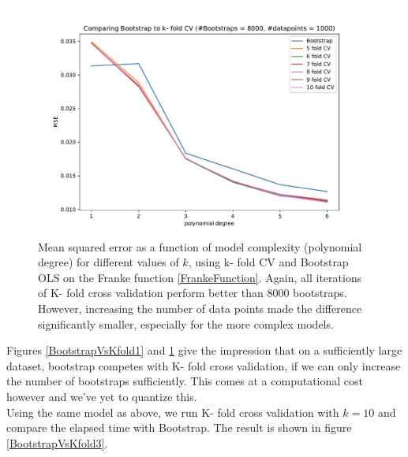 \documentclass[11pt,a4paper,titlepage]{article}
\begin{document}
\begin{figure}[H]
\centering

\includegraphics[trim=1cm 0.2cm 1.5cm 1.2cm, clip=true,scale = 0.6]{KfoldVsBootstrap_k5to10_8kBootstraps_1000dps.pdf}
\caption[Comparing MSE from Bootstrap vs. K- fold CV -1000 data points]{Mean squared error as a function of model complexity (polynomial degree) for different values of $k$, using k- fold CV and Bootstrap OLS on the Franke function \eqref{FrankeFunction}. Again, all iterations of K- fold cross validation perform better than 8000 bootstraps. However, increasing the number of data points made the difference significantly smaller, especially for the more complex models.}\label{BootstrapVsKfold2}
\end{figure}
Figures \ref{BootstrapVsKfold1} and \ref{BootstrapVsKfold2} give the impression that on a sufficiently large dataset, bootstrap competes with K- fold cross validation, if we can only increase the number of bootstraps sufficiently. This comes at a computational cost however and we've yet to quantize this.\\Using the same model as above, we run K- fold cross validation with $k=10$ and compare the elapsed time with Bootstrap. The result is shown in figure \ref{BootstrapVsKfold3}.
\end{document}

